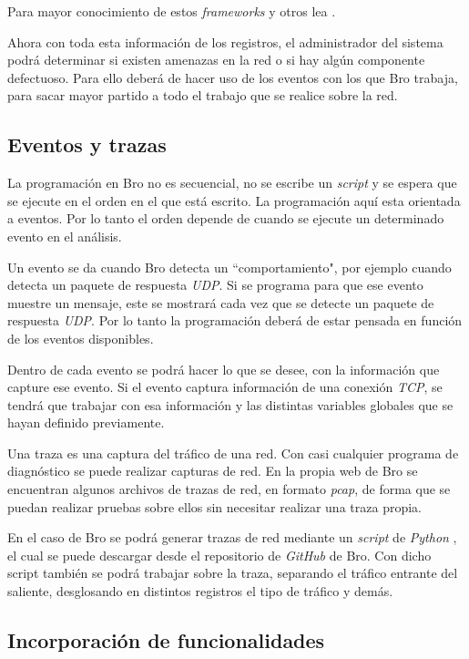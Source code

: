 \intro Para mayor conocimiento de estos \textit{frameworks} y otros lea \cite{broframeworks}.

\intro Ahora con toda esta información de los registros, el administrador del sistema podrá determinar si existen amenazas en la red o si hay algún componente defectuoso. Para ello deberá de hacer uso de los eventos con los que Bro trabaja, para sacar mayor partido a todo el trabajo que se realice sobre la red.

\subsection{Eventos y trazas}

La programación en Bro no es secuencial, no se escribe un \textit{script} y se espera que se ejecute en el orden 
en el que está escrito. La programación aquí esta orientada a eventos. Por lo tanto el orden depende de cuando 
se ejecute un determinado evento en el análisis.

\intro Un evento se da cuando Bro detecta un ``comportamiento", por ejemplo cuando detecta un paquete 
de respuesta \textit{UDP}. Si se programa para que ese evento muestre un mensaje, este se mostrará cada vez que se detecte un paquete de respuesta \textit{UDP}. Por lo tanto la programación deberá de estar pensada en función de los eventos disponibles.

\intro Dentro de cada evento se podrá hacer lo que se desee, con la información que capture ese evento. Si 
el evento captura información de una conexión \textit{TCP}, se tendrá que trabajar con esa información y las 
distintas variables globales que se hayan definido previamente.

\intro Una traza es una captura del tráfico de una red. Con casi cualquier programa de diagnóstico se puede 
realizar capturas de red. En la propia web de Bro se encuentran algunos archivos de trazas de red, en 
formato \textit{pcap}, de forma que se puedan realizar pruebas sobre ellos sin necesitar realizar una 
traza propia.

\intro En el caso de Bro se podrá generar trazas de red mediante un \textit{script} de \textit{Python}
\cite{brotrace}, el cual se puede descargar desde el repositorio de \textit{GitHub} de Bro. Con dicho script también 
se podrá trabajar sobre la traza, separando el tráfico entrante del saliente, desglosando en distintos registros 
el tipo de tráfico y demás.


\subsection{Incorporación de funcionalidades}

